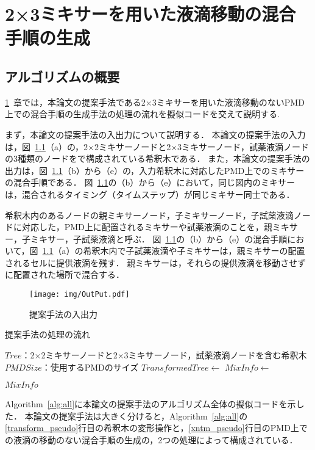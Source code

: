\chapter{{2×3ミキサーを用いた液滴移動の混合手順の生成}}
\label{proposed}
\section{アルゴリズムの概要}
\ref{proposed}~章では，本論文の提案手法である2$\times$3ミキサーを用いた液滴移動のないPMD上での混合手順の生成手法の処理の流れを擬似コードを交えて説明する.


まず，本論文の提案手法の入出力について説明する．
本論文の提案手法の入力は，図~\ref{fig:inputoutput}（a）の，2$\times$2ミキサーノードと2$\times$3ミキサーノード，試薬液滴ノードの3種類のノードをで構成されている希釈木である．
また，本論文の提案手法の出力は，図~\ref{fig:inputoutput}（b）から（e）の，入力希釈木に対応したPMD上でのミキサーの混合手順である．
図~\ref{fig:inputoutput}の（b）から（e）において，同じ図内のミキサーは，混合されるタイミング（タイムステップ）が同じミキサー同士である．

希釈木内のあるノードの親ミキサーノード，子ミキサーノード，子試薬液滴ノードに対応した，PMD上に配置されるミキサーや試薬液滴のことを，親ミキサー，子ミキサー，子試薬液滴と呼ぶ．
図~\ref{fig:inputoutput}の（b）から（e）の混合手順において，図~\ref{fig:inputoutput}（a）の希釈木内で子試薬液滴や子ミキサーは，親ミキサーの配置されるセルに提供液滴を残す．
親ミキサーは，それらの提供液滴を移動させずに配置された場所で混合する．

\begin{figure}[tbp]
 \centering\texttt{[image: img/OutPut.pdf]}
 \caption{提案手法の入出力}\label{fig:inputoutput}
\end{figure}

\begin{algorithm}[tbp]
 \caption{提案手法の処理の流れ}\label{alg:all}
 \begin{algorithmic}[1]
     \Require $\mathit{Tree}$：2$\times$2ミキサーノードと2$\times$3ミキサーノード，試薬液滴ノードを含む希釈木 
     \Require $\mathit{PMDSize}$：使用するPMDのサイズ
     \State $\mathit{TransformedTree} \gets$  \label{transform_pseudo}
     \State $\mathit{MixInfo \gets}$  \label{xntm_pseudo}

      \Return $\mathit{MixInfo}$
 \end{algorithmic}
\end{algorithm}
Algorithm~\ref{alg:all}に本論文の提案手法のアルゴリズム全体の擬似コードを示した．
本論文の提案手法は大きく分けると，Algorithm~\ref{alg:all}の\ref{transform_pseudo}行目の希釈木の変形操作と，\ref{xntm_pseudo}行目のPMD上での液滴の移動のない混合手順の生成の，2つの処理によって構成されている．

